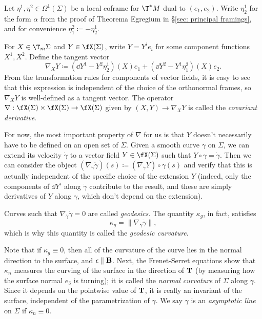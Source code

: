 \begin{rem}\label{rem covariant derivative on surfaces}
    Let $\eta^1,\eta^2\in\Omega^1(\Sigma)$ be a local coframe for $\T^\ast M$ dual to $(e_1,e_2)$. Write $\eta^1_2$ for the form $\alpha$ from the proof of Theorema Egregium in \S\ref{sec: principal framings}, and for convenience $\eta^2_1\coloneqq -\eta^1_2$.

    For $X\in \T_m \Sigma$ and $Y\in\fX(\Sigma)$, write $Y=Y^ie_i$ for some component functions $X^1,X^2$. Define the tangent vector 
    \[\nabla_X Y\coloneqq (\dd Y^1-Y^2\eta^1_2)(X)e_1+(\dd Y^2-Y^1\eta^2_1)(X)e_2.\]
    From the transformation rules for components of vector fields, it is easy to see that this expression is independent of the choice of the orthonormal frames, so $\nabla_X Y$ is well-defined as a tangent vector. The operator $\nabla:\fX(\Sigma)\times \fX(\Sigma)\to \fX(\Sigma)$ given by $(X,Y)\to \nabla_X Y$ is called the \emph{covariant derivative}.

    For now, the most important property of $\nabla$ for us is that $Y$ doesn't necessarily have to be defined on an open set of $\Sigma$. Given a smooth curve $\gamma$ on $\Sigma$, we can extend its velocity $\dot \gamma$ to a vector field $Y\in\fX(\Sigma)$ such that $Y\circ\gamma=\dot\gamma$. Then we can consider the object $(\nabla_{\dot\gamma}\dot\gamma)(s)\coloneqq (\nabla_{\dot\gamma}Y)\circ\gamma(s)$ and verify that this is actually independent of the specific choice of the extension $Y$ (indeed, only the components of $\dd Y^i$ along $\dot\gamma$ contribute to the result, and these are simply derivatives of $Y$ along $\gamma$, which don't depend on the extension). 
    
    Curves such that $\nabla_{\dot\gamma}\dot\gamma=0$ are called \emph{geodesics}. The quantity $\kappa_g$, in fact, satisfies 
    \[\kappa_g=\lVert\nabla_{\dot\gamma}\dot\gamma\rVert,\]
    which is why this quantity is called the \emph{geodesic curvature}. 
\end{rem}

Note that if $\kappa_g\equiv 0$, then all of the curvature of the curve lies in the normal direction to the surface, and $\bf{\epsilon}\parallel \bf{B}$. Next, the Frenet-Serret equations show that $\kappa_n$ measures the curving of the surface in the direction of $\bf{T}$ (by measuring how the surface normal $e_3$ is turning); it is called the \emph{normal curvature} of $\Sigma$ along $\gamma$. Since it depends on the pointwise value of $\bf{T}$, it is really an invariant of the surface, independent of the parametrization of $\gamma$. We say $\gamma$ is an \emph{asymptotic line} on $\Sigma$ if $\kappa_n\equiv 0$.

